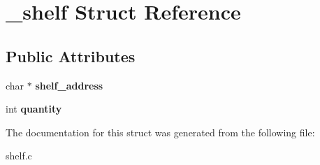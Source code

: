 \hypertarget{struct__shelf}{}\section{\+\_\+shelf Struct Reference}
\label{struct__shelf}
\subsection*{Public Attributes}
\begin{DoxyCompactItemize}
\item 
char $\ast$ {\bfseries shelf\+\_\+address}\hypertarget{struct__shelf_a8791d1ccd2e7d9d21bc27383f4a6bae5}{}\label{struct__shelf_a8791d1ccd2e7d9d21bc27383f4a6bae5}

\item 
int {\bfseries quantity}\hypertarget{struct__shelf_a06d08b16085256ece71bc65ebc1d4867}{}\label{struct__shelf_a06d08b16085256ece71bc65ebc1d4867}

\end{DoxyCompactItemize}


The documentation for this struct was generated from the following file\+:\begin{DoxyCompactItemize}
\item 
shelf.\+c\end{DoxyCompactItemize}
